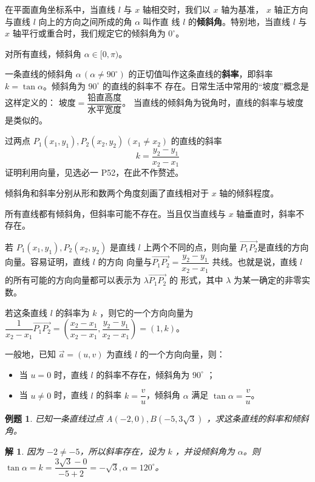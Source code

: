 \documentclass[a4paper,openany]{ctexbook}
\newtheorem{example}{例题}[section]
\newtheorem*{solution}{解}
\renewcommand{\vec}{\overrightarrow}
\begin{document}
在平面直角坐标系中，当直线 \(l\) 与 \(x\) 轴相交时，我们以 \(x\) 轴为基准， \(x\) 轴正方向与直线 \(l\) 向上的方向之间所成的角 \(\alpha\) 叫作直
线 \(l\) 的\textbf{倾斜角}。特别地，当直线 \(l\) 与 \(x\) 轴平行或重合时，我们规定它的倾斜角为 \(0^\circ\)。

对所有直线，倾斜角 \(\alpha \in [0,\pi )\)。

一条直线的倾斜角 \(\alpha\,(\alpha \neq 90^\circ)\) 的正切值叫作这条直线的\textbf{斜率}，即斜率 \(k = \tan \alpha\)。倾斜角为 \(90^\circ\) 的直线的斜率不
存在。日常生活中常用的“坡度”概念是这样定义的： \(\text{坡度} = \dfrac{\text{铅直高度}}{\text{水平宽度}} \)。 当直线的倾斜角为锐角时，直线的斜率与坡度是类似的。

过两点 \(P_1(x_1,y_1),P_2(x_2,y_2)\, (x_1 \neq x_2)\) 的直线的斜率
\[\boxed{k = \dfrac{y_2 - y_1}{x_2 - x_1}} \]
证明利用向量，见选必一 P52，在此不作赘述。

倾斜角和斜率分别从形和数两个角度刻画了直线相对于 \(x\) 轴的倾斜程度。

所有直线都有倾斜角，但斜率可能不存在。当且仅当直线与 \(x\) 轴垂直时，斜率不存在。

若 \(P_1(x_1,y_1),P_2(x_2,y_2)\) 是直线 \(l\) 上两个不同的点，则向量 \(\vec{P_1P_2}\)是直线的方向向量。容易证明，直线 \(l\) 的方向
向量与\(\vec{P_1P_2} = \dfrac{y_2 - y_1}{x_2 - x_1} \) 共线。也就是说，直线 \(l\) 的所有可能的方向向量都可以表示为 \(\lambda\vec{P_1P_2}\) 的
形式，其中 \(\lambda\) 为某一确定的非零实数。

若这条直线 \(l\) 的斜率为 \(k\) ，则它的一个方向向量为
\(\dfrac{1}{x_2 - x_1}\vec{P_1P_2} = \left(\dfrac{x_2 - x_1}{x_2 - x_1},\dfrac{y_2 - y_1}{x_2 - x_1} \right) =(1,k)\)。

一般地，已知 \(\vec{a} =(u,v)\) 为直线 \(l\) 的一个方向向量，则：
\begin{itemize}
    \item 当 \(u = 0\) 时，直线 \(l\) 的斜率不存在，倾斜角为 \(90^\circ\) ；
    \item 当 \(u \neq 0\) 时，直线 \(l\) 的斜率 \(k = \dfrac{v}{u}\)，倾斜角 \(\alpha\) 满足 \(\tan \alpha = \dfrac{v}{u}\)。
\end{itemize}

\begin{example}
    已知一条直线过点 \(A( - 2, 0),B( - 5,3 \sqrt{3})\) ，求这条直线的斜率和倾斜角。
\end{example}

\begin{solution}
    因为 \( - 2 \neq - 5\)，所以斜率存在，设为 \(k\) ，并设倾斜角为 \(\alpha\)。则
    \(\tan \alpha =k = \dfrac{3 \sqrt{3} - 0}{ - 5 + 2} = - \sqrt{3},\alpha = 120^\circ\)。
\end{solution}
\end{document}

